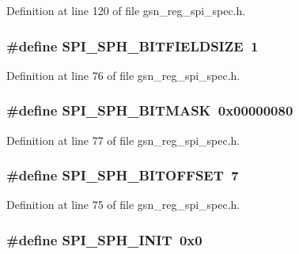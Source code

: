 Definition at line 120 of file gsn\_\-reg\_\-spi\_\-spec.h.

\hypertarget{a00573_a3f91a0357ac087d592b9bc795d07fb99}{
\subsubsection[{SPI\_\-SPH\_\-BITFIELDSIZE}]{\setlength{\rightskip}{0pt plus 5cm}\#define SPI\_\-SPH\_\-BITFIELDSIZE~1}}
\label{a00573_a3f91a0357ac087d592b9bc795d07fb99}


Definition at line 76 of file gsn\_\-reg\_\-spi\_\-spec.h.

\hypertarget{a00573_ad89722a0f921d33192794b846a42448d}{
\subsubsection[{SPI\_\-SPH\_\-BITMASK}]{\setlength{\rightskip}{0pt plus 5cm}\#define SPI\_\-SPH\_\-BITMASK~0x00000080}}
\label{a00573_ad89722a0f921d33192794b846a42448d}


Definition at line 77 of file gsn\_\-reg\_\-spi\_\-spec.h.

\hypertarget{a00573_a029a19f64a485ace0d83faf36ef2166e}{
\subsubsection[{SPI\_\-SPH\_\-BITOFFSET}]{\setlength{\rightskip}{0pt plus 5cm}\#define SPI\_\-SPH\_\-BITOFFSET~7}}
\label{a00573_a029a19f64a485ace0d83faf36ef2166e}


Definition at line 75 of file gsn\_\-reg\_\-spi\_\-spec.h.

\hypertarget{a00573_a8829e8547ceb20ef14e7c8264985f681}{
\subsubsection[{SPI\_\-SPH\_\-INIT}]{\setlength{\rightskip}{0pt plus 5cm}\#define SPI\_\-SPH\_\-INIT~0x0}}
\label{a00573_a8829e8547ceb20ef14e7c8264985f681}


